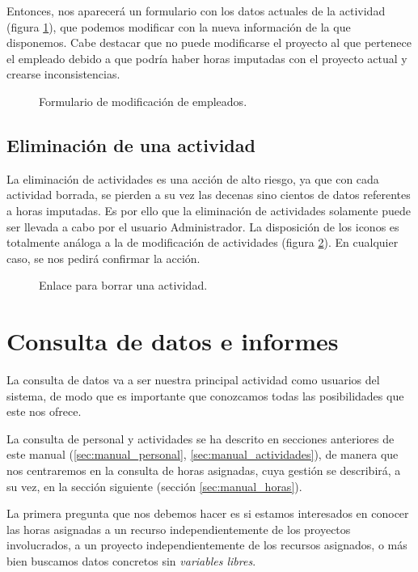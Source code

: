 Entonces, nos aparecerá un formulario con los datos actuales de la actividad
(figura \ref{fig:form_mod_actividad}), que podemos modificar con la nueva
información de la que disponemos. Cabe destacar que no puede modificarse el
proyecto al que pertenece el empleado debido a que podría haber horas imputadas
con el proyecto actual y crearse inconsistencias.

\begin{figure}
\centering
{}
\caption{Formulario de modificación de empleados.}
\label{fig:form_mod_actividad}
\end{figure}
 
\subsection{Eliminación de una actividad}

La eliminación de actividades es una acción de alto riesgo, ya que con cada
actividad borrada, se pierden a su vez las decenas sino cientos de datos
referentes a horas imputadas. Es por ello que la eliminación de actividades
solamente puede ser llevada a cabo por el usuario Administrador. La
disposición de los iconos es totalmente análoga a la de modificación de
actividades (figura \ref{fig:bor_actividad}). En cualquier caso, se nos pedirá
confirmar la acción.

\begin{figure}
\centering
{}
\caption{Enlace para borrar una actividad.}
\label{fig:bor_actividad}
\end{figure}

\section{Consulta de datos e informes}

La consulta de datos va a ser nuestra principal actividad como usuarios del
sistema, de modo que es importante que conozcamos todas las posibilidades que
este nos ofrece.

La consulta de personal y actividades se ha descrito en secciones
anteriores de este manual (\ref{sec:manual_personal},
\ref{sec:manual_actividades}), de manera que nos centraremos en la consulta de
horas asignadas, cuya gestión se describirá, a su vez, en la sección siguiente
(sección \ref{sec:manual_horas}).

La primera pregunta que nos debemos hacer es si estamos interesados en conocer
las horas asignadas a un recurso independientemente de los proyectos
involucrados, a un proyecto independientemente de los recursos asignados, o más
bien buscamos datos concretos sin \textit{variables libres}.

